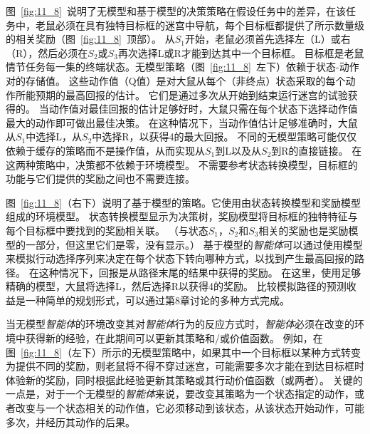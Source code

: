 {{{图~\ref{fig:11_8}~说明了无模型和基于模型的决策策略在假设任务中的差异，在该任务中，老鼠必须在具有独特目标框的迷宫中导航，每个目标框都提供了所示数量级的相关奖励（图~\ref{fig:11_8}~顶部）。
从$ S_1 $开始，老鼠必须首先选择左（L）或右（R），然后必须在$ S_2 $或$ S_3 $再次选择L或R才能到达其中一个目标框。
目标框是老鼠情节任务每一集的终端状态。无模型策略（图~\ref{fig:11_8}~左下）依赖于状态-动作对的存储值。
这些动作值（Q值）是对大鼠从每个（非终点）状态采取的每个动作所能预期的最高回报的估计。
它们是通过多次从开始到结束运行迷宫的试验获得的。
当动作值对最佳回报的估计足够好时，大鼠只需在每个状态下选择动作值最大的动作即可做出最佳决策。
在这种情况下，当动作值估计足够准确时，大鼠从$ S_1 $中选择L，从$ S_2 $中选择R，以获得4的最大回报。
不同的无模型策略可能仅仅依赖于缓存的策略而不是操作值，从而实现从$ S_1 $到L以及从$ S_2 $到R的直接链接。
在这两种策略中，决策都不依赖于环境模型。
不需要参考状态转换模型，目标框的功能与它们提供的奖励之间也不需要连接。


图~\ref{fig:11_8}（右下）说明了基于模型的策略。它使用由状态转换模型和奖励模型组成的环境模型。
状态转换模型显示为决策树，奖励模型将目标框的独特特征与每个目标框中要找到的奖励相关联。
（与状态$ S_1 $，$ S_2 $和$ S_3 $相关的奖励也是奖励模型的一部分，但这里它们是零，没有显示。）
基于模型的\textit{智能体}可以通过使用模型来模拟行动选择序列来决定在每个状态下转向哪种方式，以找到产生最高回报的路径。
在这种情况下，回报是从路径末尾的结果中获得的奖励。
在这里，使用足够精确的模型，大鼠将选择L，然后选择R以获得4的奖励。
比较模拟路径的预测收益是一种简单的规划形式，可以通过第8章讨论的多种方式完成。


当无模型\textit{智能体}的环境改变其对\textit{智能体}行为的反应方式时，\textit{智能体}必须在改变的环境中获得新的经验，在此期间可以更新其策略和/或价值函数。
例如，在图~\ref{fig:11_8}（左下）所示的无模型策略中，如果其中一个目标框以某种方式转变为提供不同的奖励，则老鼠将不得不穿过迷宫，可能需要多次才能在到达目标框时体验新的奖励，同时根据此经验更新其策略或其行动价值函数（或两者）。
关键的一点是，对于一个无模型的\textit{智能体}来说，要改变其策略为一个状态指定的动作，或者改变与一个状态相关的动作值，它必须移动到该状态，从该状态开始动作，可能多次，并经历其动作的后果。


}}}
